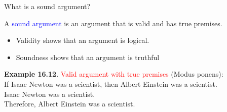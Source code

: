\documentclass[aspectratio=169]{beamer}
\providecommand{\Blue}[1]{\textcolor{blue}{#1}}
\providecommand{\Red}[1]{\textcolor{red}{#1}}
\begin{document}
\begin{frame}[plain]{What is a sound argument?}


A \Blue{sound argument} is an argument that is valid and has true premises.

 \begin{itemize} 
  \item Validity shows that an argument is logical.
  \item Soundness shows that an argument is truthful
 \end{itemize}
 
 {\bf Example 16.12}. \Red{Valid argument with true premises} (Modus ponens):\\
     If Isaac Newton was a scientist, then Albert Einstein was  a
      scientist.\\
     Isaac Newton was a scientist. \\
     Therefore, Albert Einstein was a scientist.


\end{frame}
\end{document}
